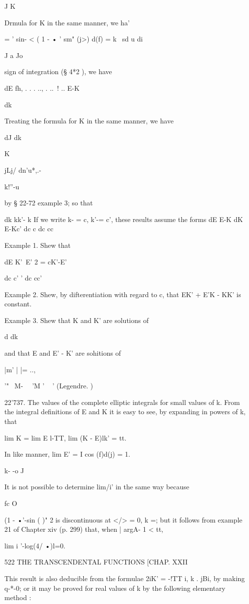 J K

Drmula for K in the same manner, we ha'

= ' sin- < ( 1 - • ' sm" (j>) d(f) = k \ sd u di

J a Jo

sign of integration (§ 4*2 ), we have

dE fh, . . . .., . ..\ ! .. E-K

dk

Treating the formula for K in the same manner, we have

dJ dk

K

jLj/ dn'u*,.-

k!''-u

by § 22-72 example 3; so that

dk kk'- k If we write k- = c, k'-= c', these results assume the forms
dE E-K dK E-Kc' dc c dc cc

Example 1. Shew that

 dE K'~E' 2 = cK'-E'

dc c' ' dc cc'

Example 2. Shew, by difterentiation with regard to c, that EK' + E'K -
KK' is constant.

Example 3. Shew that K and K' are solutions of

d dk

and that E and E' - K' are sohitions of

|m' | |= ..,

 '" ~M- \ \ 'M ' ~ ' (Legendre. )

22'737. The values of the complete elliptic integrals for small values
of k. From the integral definitions of E and K it is easy to see, by
expanding in powers of k, that

lim K = lim E l-TT, lim (K - E)lk' = tt.

In like manner, lim E' = I cos (f)d(j) = 1.

k- -o J

It is not possible to determine lim/i' in the same way because

fc O

(1 - •'-sin ( )" 2 is discontinuous at </> = 0, k =; but it follows
from example 21 of Chapter xiv (p. 299) that, when | argA- 1 < tt,

lim i '-log(4/ •)l=0.

522 THE TRANSCENDENTAL FUNCTIONS [CHAP. XXII

This result is also deducible from the formulae 2iK' = -!TT i, k .
jBi, by making q-*-0; or it may be proved for real values of k by the
following elementary method :

